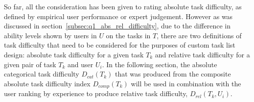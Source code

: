 So far, all the consideration has been given to rating absolute task difficulty, as defined by empirical user performance or expert judgement.
However as was discussed in section~\ref{subsec:q1_abs_rel_difficulty}, due to the difference in ability levels shown by users in $U$ on the tasks in $T$, there are two definitions of task difficulty that need to be considered for the purposes of custom task list design: absolute task difficulty for a given task $T_k$ and relative task difficulty for a given pair of task $T_k$ and user $U_i$.
In the following section, the absolute categorical task difficulty $D_{cat}(T_k)$ that was produced from the composite absolute task difficulty index $D_{comp}(T_k)$ will be used in combination with the user ranking by experience to produce relative task difficulty, $D_{rel}(T_k, U_i)$.